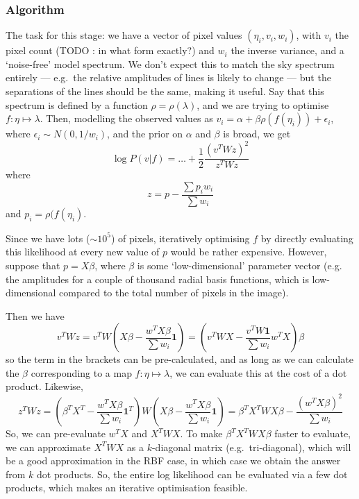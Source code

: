 \subsubsection{Algorithm}
\label{subsubsec:coarseAlignmentAlgorithm}

The task for this stage: we have a vector of pixel values
$(\eta_i, v_i, w_i)$, with $v_i$ the pixel count (TODO : in what
form exactly?) and $w_i$ the inverse variance, and a `noise-free'
model spectrum. We don't expect this to match the sky spectrum entirely
--- e.g.\ the relative amplitudes of lines is likely to change --- but the
separations of the lines should be the same, making it useful.
Say that this spectrum is defined by a function $\rho = \rho(\lambda)$,
and we are trying to optimise $f : \eta \mapsto \lambda$.
Then, modelling the observed values as $v_i = \alpha + \beta \rho (f
(\eta_i)) + \epsilon_i$, where $\epsilon_i \sim N(0,1/w_i)$, and the
prior on $\alpha$ and $\beta$ is broad, we get
\[
\log P(v|f) = \dots + \frac{1}{2} \frac{(v^T W z)^2}{z^T W z}
\]
where
\[
z = p - \frac{\sum p_i w_i}{\sum w_i}
\]
and $p_i = \rho (f (\eta_i)$.

Since we have lots ($\sim 10^5$) of pixels, iteratively optimising $f$
by directly evaluating this likelihood at every new value of $p$ would
be rather expensive. However, suppose that $p = X \beta$, where $\beta$
is some `low-dimensional' parameter vector (e.g. the amplitudes for a
couple of thousand radial basis functions, which is low-dimensional
compared to the total number of pixels in the image).

Then we have
\[
v^T W z = v^T W \left(X \beta - \frac{w^T X \beta}{\sum w_i}\mathbf{1}\right)
= \left(v^T W X - \frac{v^T W \mathbf{1}}{\sum w_i} w^T X\right) \beta
\]
so the term in the brackets can be pre-calculated, and as long as we can
calculate the $\beta$ corresponding to a map $f : \eta \mapsto \lambda$,
we can evaluate this at the cost of a dot product. Likewise,
\[
z^T W z = \left(\beta^T X^T - \frac{w^T X \beta}{\sum w_i} \mathbf{1}^T\right)
W \left(X \beta - \frac{w^T X \beta}{\sum w_i} \mathbf{1}\right)
= \beta^T X^T W X \beta - \frac{(w^T X \beta)^2}{\sum w_i}
\] 
So, we can pre-evaluate $w^T X$ and $X^T W X$. To make $\beta^T X^T W X \beta$
faster to evaluate, we can approximate $X^T W X$ as a $k$-diagonal matrix
(e.g.\ tri-diagonal), which will be a good approximation in the RBF case, in which
case we obtain the answer from $k$ dot products. So, the entire log
likelihood can be evaluated via a few dot products, which makes an iterative
optimisation feasible.

